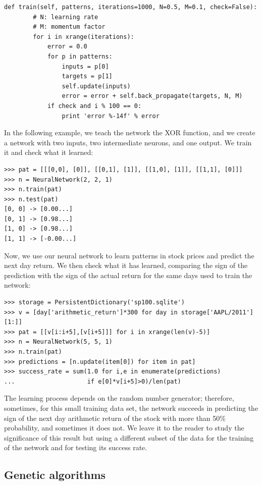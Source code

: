 \documentclass[justified,sixbynine]{tufte-book}
\def\ft{\small\tt}
\theoremstyle{plain}%
\theoremstyle{definition}
\theoremstyle{remark}
\begin{document}
\begin{fullwidth}
\begin{lstlisting}[caption={in file: {\ft nlib.py}}]
    def train(self, patterns, iterations=1000, N=0.5, M=0.1, check=False):
        # N: learning rate
        # M: momentum factor
        for i in xrange(iterations):
            error = 0.0
            for p in patterns:
                inputs = p[0]
                targets = p[1]
                self.update(inputs)
                error = error + self.back_propagate(targets, N, M)
            if check and i % 100 == 0:
                print 'error %-14f' % error
\end{lstlisting}

In the following example, we teach the network the XOR function, and we create a network with two inputs, two intermediate neurons, and one output. We train it and check what it learned:

\begin{lstlisting}[caption={in file: {\ft nlib.py}}]
>>> pat = [[[0,0], [0]], [[0,1], [1]], [[1,0], [1]], [[1,1], [0]]]
>>> n = NeuralNetwork(2, 2, 1)
>>> n.train(pat)
>>> n.test(pat)
[0, 0] -> [0.00...]
[0, 1] -> [0.98...]
[1, 0] -> [0.98...]
[1, 1] -> [-0.00...]
\end{lstlisting}

Now, we use our neural network to learn patterns in stock prices and predict the next day return. We then check what it has learned, comparing the sign of the prediction with the sign of the actual return for the same days used to train the network:
\begin{lstlisting}[caption={in file: {\ft test.py}}]
>>> storage = PersistentDictionary('sp100.sqlite')
>>> v = [day['arithmetic_return']*300 for day in storage['AAPL/2011'][1:]]
>>> pat = [[v[i:i+5],[v[i+5]]] for i in xrange(len(v)-5)]
>>> n = NeuralNetwork(5, 5, 1)
>>> n.train(pat)
>>> predictions = [n.update(item[0]) for item in pat]
>>> success_rate = sum(1.0 for i,e in enumerate(predictions)
...                    if e[0]*v[i+5]>0)/len(pat)
\end{lstlisting}
The learning process depends on the random number generator; therefore, sometimes, for this small training data set, the network succeeds in predicting the sign of the next day arithmetic return of the stock with more than 50\% probability, and sometimes it does not. We leave it to the reader to study the significance of this result but using a different subset of the data for the training of the network and for testing its success rate.
\goodbreak\subsection{Genetic algorithms}


\end{fullwidth}
\end{document}
